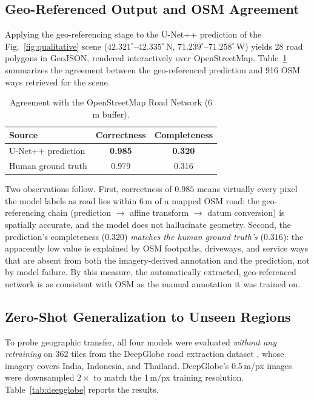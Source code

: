 \documentclass[conference]{IEEEtran}
\begin{document}
\subsection{Geo-Referenced Output and OSM Agreement}
Applying the geo-referencing stage to the U-Net++ prediction of the
Fig.~\ref{fig:qualitative} scene ($42.321^{\circ}$--$42.335^{\circ}$\,N,
$71.239^{\circ}$--$71.258^{\circ}$\,W) yields 28 road polygons in GeoJSON,
rendered interactively over OpenStreetMap. Table~\ref{tab:osm} summarizes the
agreement between the geo-referenced prediction and 916 OSM ways retrieved for
the scene.

\begin{table}[t]
\caption{Agreement with the OpenStreetMap Road Network (6 m buffer).}
\label{tab:osm}
\centering
\begin{tabular}{@{}lcc@{}}
\toprule
Source & Correctness & Completeness \\
\midrule
U-Net++ prediction        & \textbf{0.985} & \textbf{0.320} \\
Human ground truth        & 0.979 & 0.316 \\
\bottomrule
\end{tabular}
\end{table}

Two observations follow. First, correctness of $0.985$ means virtually every
pixel the model labels as road lies within 6\,m of a mapped OSM road: the
geo-referencing chain (prediction $\rightarrow$ affine transform
$\rightarrow$ datum conversion) is spatially accurate, and the model does not
hallucinate geometry. Second, the prediction's completeness ($0.320$)
\emph{matches the human ground truth's} ($0.316$): the apparently low value is
explained by OSM footpaths, driveways, and service ways that are absent from
both the imagery-derived annotation and the prediction, not by model failure.
By this measure, the automatically extracted, geo-referenced network is as
consistent with OSM as the manual annotation it was trained on.

\subsection{Zero-Shot Generalization to Unseen Regions}
To probe geographic transfer, all four models were evaluated \emph{without any
retraining} on 362 tiles from the DeepGlobe road extraction dataset
\cite{demir2018deepglobe}, whose imagery covers India, Indonesia, and Thailand.
DeepGlobe's 0.5\,m/px images were downsampled $2\times$ to match the 1\,m/px
training resolution. Table~\ref{tab:deepglobe} reports the results.
\end{document}

